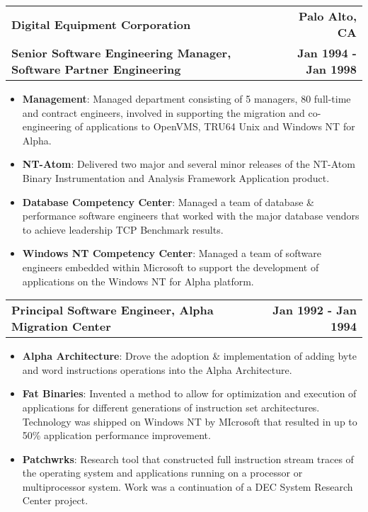 \documentclass[letterpaper,10pt, sans]{article}
\makeatletter
\newcommand{\resumeCompanyHeading}[4]{
  \vspace{-1pt}
    \item
    \begin{tabular*}{1.0\textwidth}[t]{l@{\extracolsep{\fill}}r}
      \textbf{#1} & \textbf{#2} \\
      \textbf{#3} & \textbf{#4}
    \end{tabular*}\vspace{-1pt}
  }
\newcommand{\resumeCompanyPositionHeading}[2]{
    \vspace{-1pt}
      \item
      \begin{tabular*}{1.0\textwidth}{l@{\extracolsep{\fill}}r}
        \textbf{#1} & \textbf{#2}
    \end{tabular*}\vspace{-1pt}
}
\newcommand{\resumeItem}[2]{\item{{\textbf{#1}}: {#2 \vspace{1pt}}}}
\newcommand{\resumeItemListStart}{\begin{itemize}}\vspace{-1pt}
\newcommand{\resumeItemListEnd}{\end{itemize}}\vspace{-1pt}
\makeatother
\begin{document}
        \resumeCompanyHeading
          {Digital Equipment Corporation}{Palo Alto, CA}
          {Senior Software Engineering Manager, Software Partner Engineering}{Jan 1994 - Jan 1998}
                \resumeItemListStart
                \resumeItem{Management}{Managed department consisting of 5 managers, 80 full-time and contract engineers, involved in supporting the migration and
                                        co-engineering of applications to OpenVMS, TRU64 Unix and Windows NT for Alpha.}
                \resumeItem{NT-Atom}{Delivered two major and several minor releases of the NT-Atom Binary Instrumentation
                             and Analysis Framework Application product.}
                \resumeItem{Database Competency Center}{Managed a team of database \& performance software engineers that worked with 
                            the major database vendors to achieve leadership TCP Benchmark results.}
                \resumeItem{Windows NT Competency Center}{Managed a team of software engineers embedded within Microsoft to support the development of applications
                            on the Windows NT for Alpha platform.}
            \resumeItemListEnd

        \resumeCompanyPositionHeading
            {Principal Software Engineer, Alpha Migration Center}{Jan 1992 - Jan 1994}
            \resumeItemListStart
            \resumeItem{Alpha Architecture}{Drove the adoption \& implementation of adding byte and word instructions operations into the Alpha Architecture.}
            \resumeItem{Fat Binaries}{Invented a method to allow for optimization and execution of applications for different generations 
                        of instruction set architectures.  Technology was shipped on Windows NT by MIcrosoft that resulted in up to 50\% application performance improvement.}
            \resumeItem{Patchwrks}{Research tool that constructed full instruction stream traces of the operating system and applications running on a processor 
                        or multiprocessor system.  Work was a continuation of a DEC System Research Center project.}
        \resumeItemListEnd
  
\end{document}
